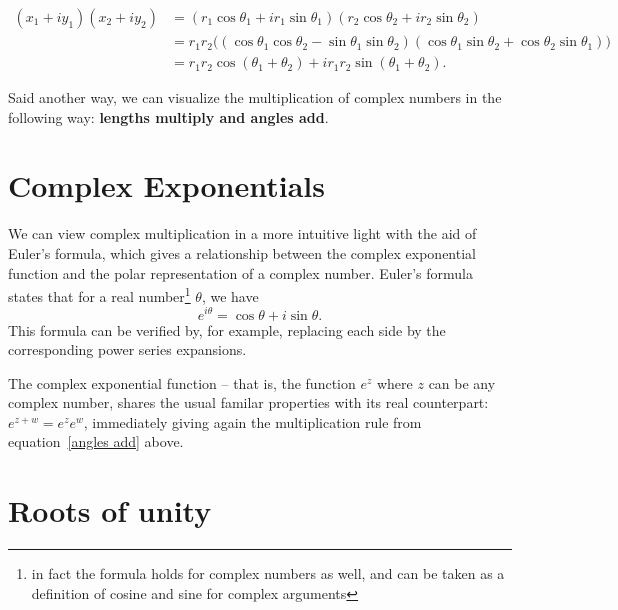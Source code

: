 \documentclass[12pt]{report}
\theoremstyle{plain}
\begin{document}
\begin{align} \label{angles add}
(x_1 + i y_1)(x_2 + i y_2) &= (r_1 \cos \theta_1 + i r_1 \sin \theta_1)(r_2 \cos \theta_2 + i r_2 \sin \theta_2) \\ &= r_1 r_2 \Big( (\cos \theta_1 \cos \theta_2 - \sin \theta_1 \sin \theta_2) (\cos \theta_1 \sin \theta_2 + \cos \theta_2 \sin \theta_1 )\Big) \\ &= r_1 r_2 \cos (\theta_1 + \theta_2) + i r_1 r_2 \sin (\theta_1 + \theta_2).
\end{align}

Said another way, we can visualize the multiplication of complex numbers in the following way: \textbf{lengths multiply and angles add}.

\section{Complex Exponentials} \label{complex exponentials}

We can view complex multiplication in a more intuitive light with the aid of Euler's formula, which gives a relationship between the complex exponential function and the polar representation of a complex number. Euler's formula states that for a real number\footnote{in fact the formula holds for complex numbers as well, and can be taken as a definition of cosine and sine for complex arguments} $\theta$, we have
\[e^{i \theta} = \cos \theta + i \sin \theta. \]
This formula can be verified by, for example, replacing each side by the corresponding power series expansions.

The complex exponential function -- that is, the function $e^z$ where $z$ can be any complex number, shares the usual familar properties with its real counterpart: $e^{z + w} = e^z e^w$, immediately giving again the multiplication rule from equation~\ref{angles add} above.

\iffalse
Let's visualize how the graph of the function $e^{i \theta}$ as a function of the real variable $\theta$. 
\fi

\iffalse
Given a complex number, expressed as \[z = r \cos \theta + i r \sin \theta,\] we see that we can raise $z$ to positive integer powers by the formula
\[z^n = r^n \cos n\theta + i r^n \sin n\theta.\]
In particular, it makes sense to extend this definition and simply define the exponential $z^s$ for any real number $s$, by the formula
\[z^s = r^s \cos s\theta + i r^s \sin s\theta\]
\fi

\section{Roots of unity}

%
%
\printindex
\end{document}
